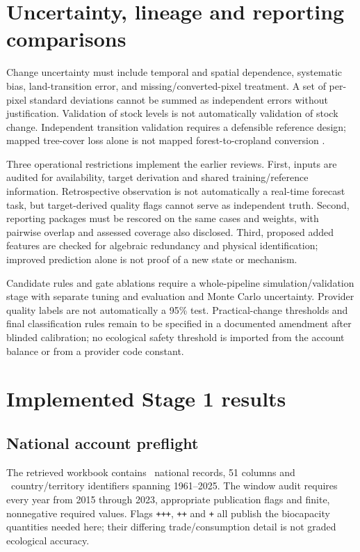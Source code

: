 \documentclass[11pt,a4paper]{article}
\begin{document}
\section{Uncertainty, lineage and reporting comparisons}
Change uncertainty must include temporal and spatial dependence, systematic bias, land-transition error, and missing/converted-pixel treatment. A set of per-pixel standard deviations cannot be summed as independent errors without justification. Validation of stock levels is not automatically validation of stock change. Independent transition validation requires a defensible reference design; mapped tree-cover loss alone is not mapped forest-to-cropland conversion \citep{Olofsson2014}.

Three operational restrictions implement the earlier reviews. First, inputs are audited for availability, target derivation and shared training/reference information. Retrospective observation is not automatically a real-time forecast task, but target-derived quality flags cannot serve as independent truth. Second, reporting packages must be rescored on the same cases and weights, with pairwise overlap and assessed coverage also disclosed. Third, proposed added features are checked for algebraic redundancy and physical identification; improved prediction alone is not proof of a new state or mechanism.

Candidate rules and gate ablations require a whole-pipeline simulation/validation stage with separate tuning and evaluation and Monte Carlo uncertainty. Provider quality labels are not automatically a 95\% test. Practical-change thresholds and final classification rules remain to be specified in a documented amendment after blinded calibration; no ecological safety threshold is imported from the account balance or from a provider code constant.

\section{Implemented Stage 1 results}
\subsection{National account preflight}
The retrieved workbook contains \NationalRows\ national records, 51 columns and \CountryIDs\ country/territory identifiers spanning 1961--2025. The window audit requires every year from 2015 through 2023, appropriate publication flags and finite, nonnegative required values. Flags \texttt{+++}, \texttt{++} and \texttt{+} all publish the biocapacity quantities needed here; their differing trade/consumption detail is not graded ecological accuracy.
\end{document}
